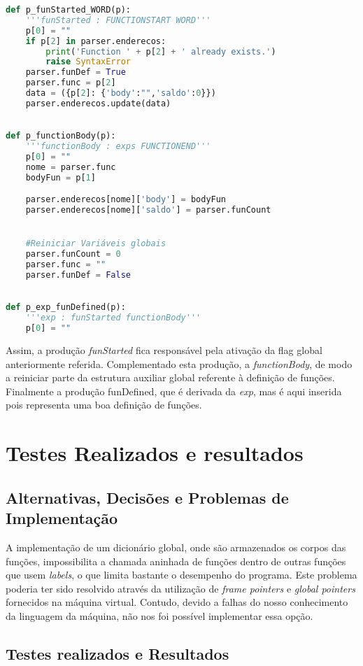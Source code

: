 \documentclass{predef}
\begin{document}
\begin{lstlisting}[language=Python]
    def p_funStarted_WORD(p):
    '''funStarted : FUNCTIONSTART WORD'''
    p[0] = ""
    if p[2] in parser.enderecos:
        print('Function ' + p[2] + ' already exists.')
        raise SyntaxError
    parser.funDef = True
    parser.func = p[2]
    data = ({p[2]: {'body':"",'saldo':0}})
    parser.enderecos.update(data)
    

def p_functionBody(p):
    '''functionBody : exps FUNCTIONEND'''
    p[0] = ""
    nome = parser.func
    bodyFun = p[1]

    parser.enderecos[nome]['body'] = bodyFun
    parser.enderecos[nome]['saldo'] = parser.funCount


    #Reiniciar Variáveis globais
    parser.funCount = 0
    parser.func = ""
    parser.funDef = False
    

def p_exp_funDefined(p):
    '''exp : funStarted functionBody'''
    p[0] = ""
\end{lstlisting}
Assim, a produção \textit{funStarted} fica responsável pela ativação da flag global anteriormente referida. Complementado esta produção, a \textit{functionBody}, de modo a reiniciar parte da estrutura auxiliar global referente à definição de funções. Finalmente a produção funDefined, que é derivada da \textit{exp}, mas é aqui inserida pois representa uma boa definição de funções.

\newpage
\section{Testes Realizados e resultados}

\subsection{Alternativas, Decisões e Problemas de Implementação }

A implementação de um dicionário global, onde são armazenados os corpos das funções, impossibilita a chamada aninhada de funções dentro de outras funções que usem \textit{labels}, o que limita bastante o desempenho do programa. Este problema poderia ter sido resolvido através da utilização de \textit{frame pointers} e \textit{global pointers} fornecidos na máquina virtual. Contudo, devido a falhas do nosso conhecimento da linguagem da máquina, não nos foi possível implementar essa opção.


\subsection{Testes realizados e Resultados}
\end{document}
